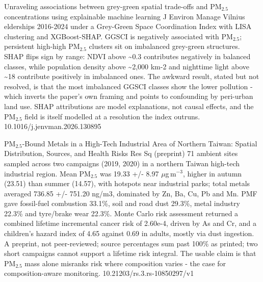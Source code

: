 \documentclass[10pt]{article}
\begin{document}
{Unraveling associations between grey-green spatial trade-offs and PM$_{2.5}$ concentrations using explainable machine learning}
{J Environ Manage}
{Vilnius elderships 2016-2024 under a Grey-Green Space Coordination Index with LISA clustering and XGBoost-SHAP. GGSCI is negatively associated with PM$_{2.5}$; persistent high-high PM$_{2.5}$ clusters sit on imbalanced grey-green structures. SHAP flips sign by range: NDVI above \textasciitilde{}0.3 contributes negatively in balanced classes, while population density above \textasciitilde{}2,000 km-2 and nighttime light above \textasciitilde{}18 contribute positively in imbalanced ones. The awkward result, stated but not resolved, is that the most imbalanced GGSCI classes show the lower pollution - which inverts the paper's own framing and points to confounding by peri-urban land use. SHAP attributions are model explanations, not causal effects, and the PM$_{2.5}$ field is itself modelled at a resolution the index outruns.}
{10.1016/j.jenvman.2026.130895}

{PM$_{2.5}$-Bound Metals in a High-Tech Industrial Area of Northern Taiwan: Spatial Distribution, Sources, and Health Risks}
{Res Sq (preprint)}
{71 ambient sites sampled across two campaigns (2019, 2020) in a northern Taiwan high-tech industrial region. Mean PM$_{2.5}$ was 19.33 +/- 8.97 $\mu$g\,m$^{-3}$, higher in autumn (23.51) than summer (14.57), with hotspots near industrial parks; total metals averaged 736.85 +/- 751.20 ng/m3, dominated by Zn, Ba, Cu, Pb and Mn. PMF gave fossil-fuel combustion 33.1\%, soil and road dust 29.3\%, metal industry 22.3\% and tyre/brake wear 22.3\%. Monte Carlo risk assessment returned a combined lifetime incremental cancer risk of 2.60e-4, driven by As and Cr, and a children's hazard index of 4.65 against 0.69 in adults, mostly via dust ingestion. A preprint, not peer-reviewed; source percentages sum past 100\% as printed; two short campaigns cannot support a lifetime risk integral. The usable claim is that PM$_{2.5}$ mass alone misranks risk where composition varies - the case for composition-aware monitoring.}
{10.21203/rs.3.rs-10850297/v1}
\end{document}
